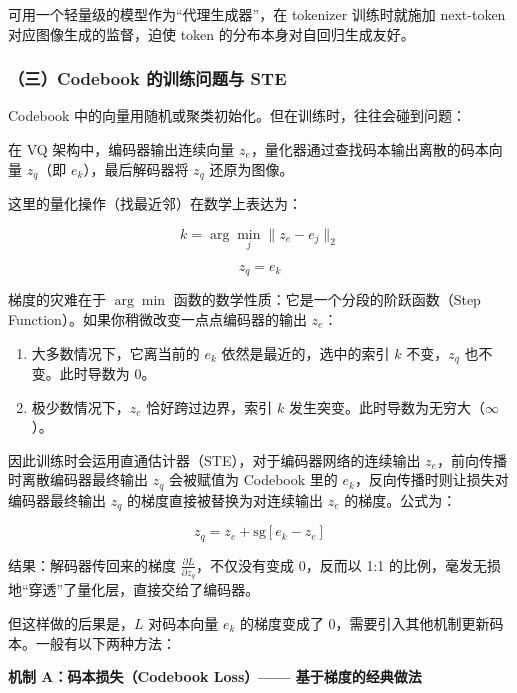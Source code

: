 可用一个轻量级的模型作为``代理生成器''，在 tokenizer 训练时就施加 next-token 对应图像生成的监督，迫使 token 的分布本身对自回归生成友好。

\hypertarget{ux4e09codebook-ux7684ux8badux7ec3ux95eeux9898ux4e0e-ste}{%
\subsubsection{（三）Codebook 的训练问题与 STE}\label{ux4e09codebook-ux7684ux8badux7ec3ux95eeux9898ux4e0e-ste}}

Codebook 中的向量用随机或聚类初始化。但在训练时，往往会碰到问题：

在 VQ 架构中，编码器输出连续向量 \(z_e\)，量化器通过查找码本输出离散的码本向量 \(z_q\)（即 \(e_k\)），最后解码器将 \(z_q\) 还原为图像。

这里的量化操作（找最近邻）在数学上表达为：

\[
k=\arg\min_j\lVert z_e-e_j\rVert_2
\]

\[
z_q=e_k
\]

梯度的灾难在于 \(\arg\min\) 函数的数学性质：它是一个分段的阶跃函数（Step Function）。如果你稍微改变一点点编码器的输出 \(z_e\)：

\begin{enumerate}
\def\labelenumi{\arabic{enumi}.}
\tightlist
\item
  大多数情况下，它离当前的 \(e_k\) 依然是最近的，选中的索引 \(k\) 不变，\(z_q\) 也不变。此时导数为 0。
\item
  极少数情况下，\(z_e\) 恰好跨过边界，索引 \(k\) 发生突变。此时导数为无穷大（\(\infty\)）。
\end{enumerate}

因此训练时会运用直通估计器（STE），对于编码器网络的连续输出 \(z_e\)，前向传播时离散编码器最终输出 \(z_q\) 会被赋值为 Codebook 里的 \(e_k\)，反向传播时则让损失对编码器最终输出 \(z_q\) 的梯度直接被替换为对连续输出 \(z_e\) 的梯度。公式为：

\[
z_q=z_e+\mathrm{sg}[e_k-z_e]
\]

结果：解码器传回来的梯度 \(\frac{\partial L}{\partial z_q}\)，不仅没有变成 0，反而以 1:1 的比例，毫发无损地``穿透''了量化层，直接交给了编码器。

但这样做的后果是，\(L\) 对码本向量 \(e_k\) 的梯度变成了 0，需要引入其他机制更新码本。一般有以下两种方法：

\textbf{机制 A：码本损失（Codebook Loss）------ 基于梯度的经典做法}

